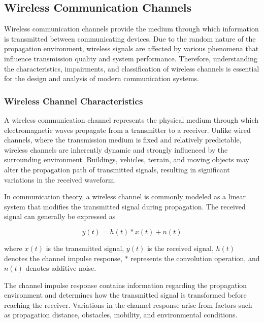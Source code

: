 \subsection{Wireless Communication Channels}

Wireless communication channels provide the medium through which information is transmitted between communicating devices. Due to the random nature of the propagation environment, wireless signals are affected by various phenomena that influence transmission quality and system performance. Therefore, understanding the characteristics, impairments, and classification of wireless channels is essential for the design and analysis of modern communication systems.

\subsubsection{Wireless Channel Characteristics}

A wireless communication channel represents the physical medium through which electromagnetic waves propagate from a transmitter to a receiver. Unlike wired channels, where the transmission medium is fixed and relatively predictable, wireless channels are inherently dynamic and strongly influenced by the surrounding environment. Buildings, vehicles, terrain, and moving objects may alter the propagation path of transmitted signals, resulting in significant variations in the received waveform.

In communication theory, a wireless channel is commonly modeled as a linear system that modifies the transmitted signal during propagation. The received signal can generally be expressed as

\begin{equation}
y(t)=h(t)\ast x(t)+n(t)
\end{equation}

where $x(t)$ is the transmitted signal, $y(t)$ is the received signal, $h(t)$ denotes the channel impulse response, $\ast$ represents the convolution operation, and $n(t)$ denotes additive noise.

The channel impulse response contains information regarding the propagation environment and determines how the transmitted signal is transformed before reaching the receiver. Variations in the channel response arise from factors such as propagation distance, obstacles, mobility, and environmental conditions.

